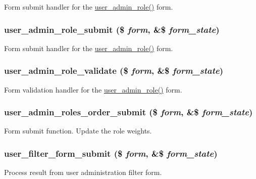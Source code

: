 Form submit handler for the \hyperlink{group__forms_ga1b97a1d994a0fff5e514d8c0b79b9d9f}{user\_\-admin\_\-role()} form. \hypertarget{user_8admin_8inc_ac85f25cd1c59104fcc4dc4f7b9dfbd2e}{
\subsubsection[{user\_\-admin\_\-role\_\-submit}]{\setlength{\rightskip}{0pt plus 5cm}user\_\-admin\_\-role\_\-submit (\$ {\em form}, \/  \&\$ {\em form\_\-state})}}
\label{user_8admin_8inc_ac85f25cd1c59104fcc4dc4f7b9dfbd2e}
Form submit handler for the \hyperlink{group__forms_ga1b97a1d994a0fff5e514d8c0b79b9d9f}{user\_\-admin\_\-role()} form. \hypertarget{user_8admin_8inc_ad03d629a48434e2a62448d3ef2dec1bd}{
\subsubsection[{user\_\-admin\_\-role\_\-validate}]{\setlength{\rightskip}{0pt plus 5cm}user\_\-admin\_\-role\_\-validate (\$ {\em form}, \/  \&\$ {\em form\_\-state})}}
\label{user_8admin_8inc_ad03d629a48434e2a62448d3ef2dec1bd}
Form validation handler for the \hyperlink{group__forms_ga1b97a1d994a0fff5e514d8c0b79b9d9f}{user\_\-admin\_\-role()} form. \hypertarget{user_8admin_8inc_a572641931024871c1d4fa6a574f20763}{
\subsubsection[{user\_\-admin\_\-roles\_\-order\_\-submit}]{\setlength{\rightskip}{0pt plus 5cm}user\_\-admin\_\-roles\_\-order\_\-submit (\$ {\em form}, \/  \&\$ {\em form\_\-state})}}
\label{user_8admin_8inc_a572641931024871c1d4fa6a574f20763}
Form submit function. Update the role weights. \hypertarget{user_8admin_8inc_aedf12621a6f405cf3032a9319771b4e1}{
\subsubsection[{user\_\-filter\_\-form\_\-submit}]{\setlength{\rightskip}{0pt plus 5cm}user\_\-filter\_\-form\_\-submit (\$ {\em form}, \/  \&\$ {\em form\_\-state})}}
\label{user_8admin_8inc_aedf12621a6f405cf3032a9319771b4e1}
Process result from user administration filter form. 